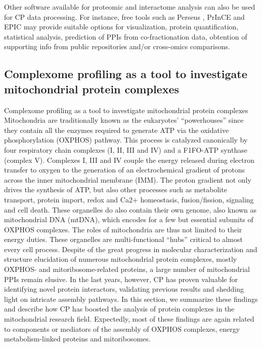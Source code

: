 Other software available for proteomic and interactome analysis can also be used for CP data processing. For instance, free tools such as Perseus \cite{Tyanova_2016b}, PrInCE \cite{Stacey_2017} and EPIC \cite{Hu_2019} may provide suitable options for visualization, protein quantification, statistical analysis, prediction of PPIs from co-fractionation data, obtention of supporting info from public repositories and/or cross-omics comparisons.

\subsection{Complexome profiling as a tool to investigate mitochondrial protein complexes} \label{ssec:CP_MS_ssec3}
Complexome profiling as a tool to investigate mitochondrial protein complexes
Mitochondria are traditionally known as the eukaryotes’ “powerhouses” since they contain all the enzymes required to generate ATP via the oxidative phosphorylation (OXPHOS) pathway. This process is catalyzed canonically by four respiratory chain complexes (I, II, III and IV) and a F1FO-ATP synthase (complex V). Complexes I, III and IV couple the energy released during electron transfer to oxygen to the generation of an electrochemical gradient of protons across the inner mitochondrial membrane (IMM). The proton gradient not only drives the synthesis of ATP, but also other processes such as metabolite transport, protein import, redox and Ca2+ homeostasis, fusion/fission, signaling and cell death. These organelles do also contain their own genome, also known as mitochondrial DNA (mtDNA), which encodes for a few but essential subunits of OXPHOS complexes. The roles of mitochondria are thus not limited to their energy duties. These organelles are multi-functional “hubs” critical to almost every cell process.
Despite of the great progress in molecular characterization and structure elucidation of numerous mitochondrial protein complexes, mostly OXPHOS- and mitoribosome-related proteins, a large number of mitochondrial PPIs remain elusive. In the last years, however, CP has proven valuable for identifying novel protein interactors, validating previous results and shedding light on intricate assembly pathways. In this section, we summarize these findings and describe how CP has boosted the analysis of protein complexes in the mitochondrial research field. Expectedly, most of these findings are again related to components or mediators of the assembly of OXPHOS complexes, energy metabolism-linked proteins and mitoribosomes.\\
